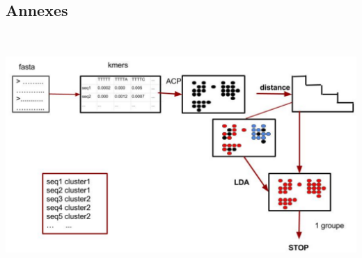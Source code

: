 \documentclass[12pt,a4paper]{article}
\begin{document}
\newpage
\thispagestyle{empty}
\begin{appendix}
\section*{Annexes}~\\[0.2cm]
    \begin{center}
        \includegraphics[scale=0.35, angle=0]{img/algo_classification.png}
        \label{a_micro}
    \end{center}
\end{appendix}
\end{document}
